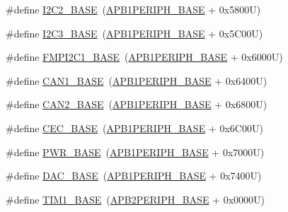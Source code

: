 \begin{DoxyCompactItemize}
\item 
\#define \hyperlink{group___peripheral__memory__map_ga04bda70f25c795fb79f163b633ad4a5d}{I2\+C2\+\_\+\+B\+A\+SE}~(\hyperlink{group___peripheral__memory__map_ga45666d911f39addd4c8c0a0ac3388cfb}{A\+P\+B1\+P\+E\+R\+I\+P\+H\+\_\+\+B\+A\+SE} + 0x5800\+U)
\item 
\#define \hyperlink{group___peripheral__memory__map_ga4e8b9198748235a1729e1e8f8f24983b}{I2\+C3\+\_\+\+B\+A\+SE}~(\hyperlink{group___peripheral__memory__map_ga45666d911f39addd4c8c0a0ac3388cfb}{A\+P\+B1\+P\+E\+R\+I\+P\+H\+\_\+\+B\+A\+SE} + 0x5\+C00\+U)
\item 
\#define \hyperlink{group___peripheral__memory__map_gac6e36f905b89086de0fceda4325a9a8e}{F\+M\+P\+I2\+C1\+\_\+\+B\+A\+SE}~(\hyperlink{group___peripheral__memory__map_ga45666d911f39addd4c8c0a0ac3388cfb}{A\+P\+B1\+P\+E\+R\+I\+P\+H\+\_\+\+B\+A\+SE} + 0x6000\+U)
\item 
\#define \hyperlink{group___peripheral__memory__map_gad8e45ea6c032d9fce1b0516fff9d8eaa}{C\+A\+N1\+\_\+\+B\+A\+SE}~(\hyperlink{group___peripheral__memory__map_ga45666d911f39addd4c8c0a0ac3388cfb}{A\+P\+B1\+P\+E\+R\+I\+P\+H\+\_\+\+B\+A\+SE} + 0x6400\+U)
\item 
\#define \hyperlink{group___peripheral__memory__map_gaf7b8267b0d439f8f3e82f86be4b9fba1}{C\+A\+N2\+\_\+\+B\+A\+SE}~(\hyperlink{group___peripheral__memory__map_ga45666d911f39addd4c8c0a0ac3388cfb}{A\+P\+B1\+P\+E\+R\+I\+P\+H\+\_\+\+B\+A\+SE} + 0x6800\+U)
\item 
\#define \hyperlink{group___peripheral__memory__map_gaacb77bc44b3f8c87ab98f241e760e440}{C\+E\+C\+\_\+\+B\+A\+SE}~(\hyperlink{group___peripheral__memory__map_ga45666d911f39addd4c8c0a0ac3388cfb}{A\+P\+B1\+P\+E\+R\+I\+P\+H\+\_\+\+B\+A\+SE} + 0x6\+C00\+U)
\item 
\#define \hyperlink{group___peripheral__memory__map_gac691ec23dace8b7a649a25acb110217a}{P\+W\+R\+\_\+\+B\+A\+SE}~(\hyperlink{group___peripheral__memory__map_ga45666d911f39addd4c8c0a0ac3388cfb}{A\+P\+B1\+P\+E\+R\+I\+P\+H\+\_\+\+B\+A\+SE} + 0x7000\+U)
\item 
\#define \hyperlink{group___peripheral__memory__map_gad18d0b914c7f68cecbee1a2d23a67d38}{D\+A\+C\+\_\+\+B\+A\+SE}~(\hyperlink{group___peripheral__memory__map_ga45666d911f39addd4c8c0a0ac3388cfb}{A\+P\+B1\+P\+E\+R\+I\+P\+H\+\_\+\+B\+A\+SE} + 0x7400\+U)
\item 
\#define \hyperlink{group___peripheral__memory__map_gaf8aa324ca5011b8173ab16585ed7324a}{T\+I\+M1\+\_\+\+B\+A\+SE}~(\hyperlink{group___peripheral__memory__map_ga25b99d6065f1c8f751e78f43ade652cb}{A\+P\+B2\+P\+E\+R\+I\+P\+H\+\_\+\+B\+A\+SE} + 0x0000\+U)

\end{DoxyCompactItemize}
